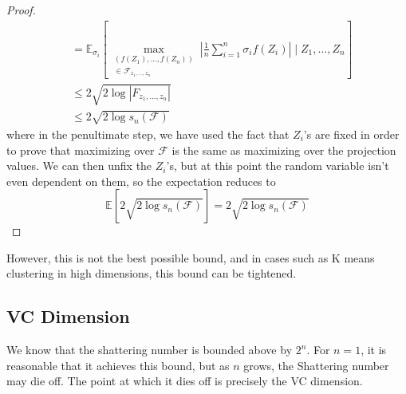 \begin{proof}
\begin{align}
      & = \mathbb{E}_{\sigma_i} \left[ \max_{\substack{(f(Z_1), \ldots, f(Z_n)) \\ \in \mathcal{F}_{z_1, \ldots, z_n}}} \left| \frac{1}{n} \sum_{i=1}^n \sigma_i f(Z_i) \right| \mid Z_1, \ldots, Z_n \right] \\
      & \leq 2 \sqrt{2 \log{| F_{z_1, \ldots, z_n}|}} \\
      & \leq 2 \sqrt{2 \log{s_n (\mathcal{F})}}
    \end{align}
    where in the penultimate step, we have used the fact that $Z_i$'s are fixed in order to prove that maximizing over $\mathcal{F}$ is the same as maximizing over the projection values. We can then unfix the $Z_i$'s, but at this point the random variable isn't even dependent on them, so the expectation reduces to 
    \begin{equation}
      \mathbb{E} \left[ 2 \sqrt{2 \log{s_n (\mathcal{F})}} \right] = 2 \sqrt{2 \log{s_n (\mathcal{F})}}
    \end{equation}
  \end{proof}

  However, this is not the best possible bound, and in cases such as K means clustering in high dimensions, this bound can be tightened. 

\subsection{VC Dimension}

  We know that the shattering number is bounded above by $2^n$. For $n = 1$, it is reasonable that it achieves this bound, but as $n$ grows, the Shattering number may die off. The point at which it dies off is precisely the VC dimension.  

